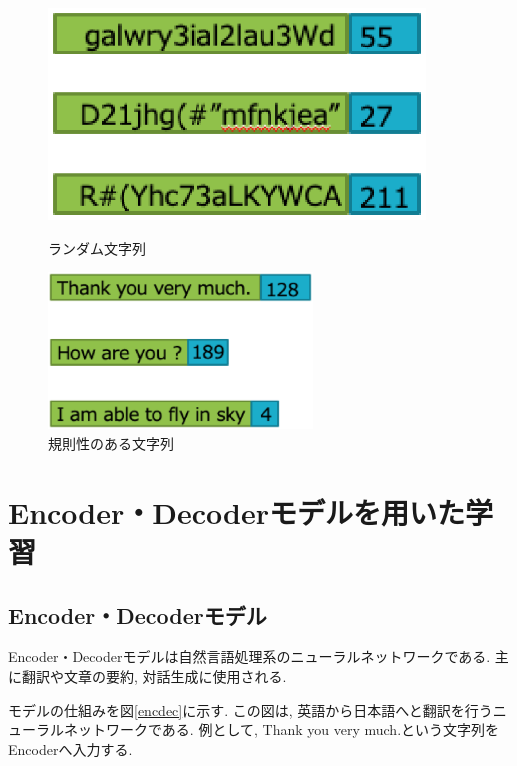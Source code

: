 \documentclass[11pt]{jbook}
\begin{document}
\begin{figure}[htbp]
 \begin{minipage}{0.5\hsize}
  \begin{center}
   \includegraphics[width=100mm]{random.eps}
  \end{center}
  \caption{ランダム文字列}
  \label{fig:one}
 \end{minipage}
 \begin{minipage}{0.5\hsize}
  \begin{center}
   \includegraphics[width=70mm]{kisokusei.eps}
  \end{center}
  \caption{規則性のある文字列}
  \label{fig:two}
 \end{minipage}
\end{figure}

\newpage

\section{Encoder・Decoderモデルを用いた学習}
\subsection{Encoder・Decoderモデル}

Encoder・Decoderモデル\cite{namba}は自然言語処理系のニューラルネットワークである.
主に翻訳や文章の要約, 対話生成に使用される.

モデルの仕組みを図\ref{encdec}に示す.
この図は, 英語から日本語へと翻訳を行うニューラルネットワークである.
例として, Thank you very much.という文字列をEncoderへ入力する.
\end{document}
